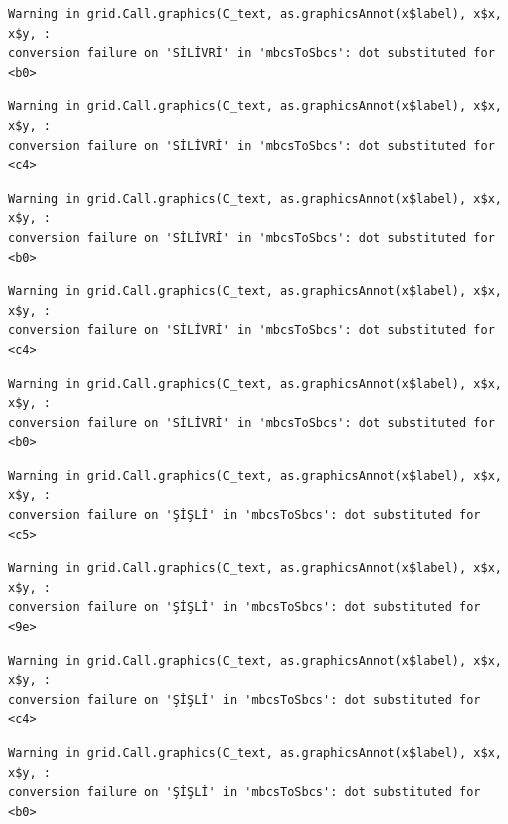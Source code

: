 \documentclass[
  11pt,
  a4paper,
  DIV=11,
  numbers=noendperiod]{scrartcl}
\begin{document}
\begin{verbatim}
Warning in grid.Call.graphics(C_text, as.graphicsAnnot(x$label), x$x, x$y, :
conversion failure on 'SİLİVRİ' in 'mbcsToSbcs': dot substituted for <b0>
\end{verbatim}

\begin{verbatim}
Warning in grid.Call.graphics(C_text, as.graphicsAnnot(x$label), x$x, x$y, :
conversion failure on 'SİLİVRİ' in 'mbcsToSbcs': dot substituted for <c4>
\end{verbatim}

\begin{verbatim}
Warning in grid.Call.graphics(C_text, as.graphicsAnnot(x$label), x$x, x$y, :
conversion failure on 'SİLİVRİ' in 'mbcsToSbcs': dot substituted for <b0>
\end{verbatim}

\begin{verbatim}
Warning in grid.Call.graphics(C_text, as.graphicsAnnot(x$label), x$x, x$y, :
conversion failure on 'SİLİVRİ' in 'mbcsToSbcs': dot substituted for <c4>
\end{verbatim}

\begin{verbatim}
Warning in grid.Call.graphics(C_text, as.graphicsAnnot(x$label), x$x, x$y, :
conversion failure on 'SİLİVRİ' in 'mbcsToSbcs': dot substituted for <b0>
\end{verbatim}

\begin{verbatim}
Warning in grid.Call.graphics(C_text, as.graphicsAnnot(x$label), x$x, x$y, :
conversion failure on 'ŞİŞLİ' in 'mbcsToSbcs': dot substituted for <c5>
\end{verbatim}

\begin{verbatim}
Warning in grid.Call.graphics(C_text, as.graphicsAnnot(x$label), x$x, x$y, :
conversion failure on 'ŞİŞLİ' in 'mbcsToSbcs': dot substituted for <9e>
\end{verbatim}

\begin{verbatim}
Warning in grid.Call.graphics(C_text, as.graphicsAnnot(x$label), x$x, x$y, :
conversion failure on 'ŞİŞLİ' in 'mbcsToSbcs': dot substituted for <c4>
\end{verbatim}

\begin{verbatim}
Warning in grid.Call.graphics(C_text, as.graphicsAnnot(x$label), x$x, x$y, :
conversion failure on 'ŞİŞLİ' in 'mbcsToSbcs': dot substituted for <b0>
\end{verbatim}
\end{document}
